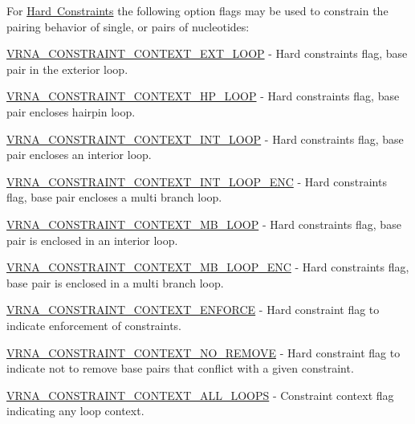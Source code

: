 For \mbox{\hyperlink{group__hard__constraints}{Hard Constraints}} the following option flags may be used to constrain the pairing behavior of single, or pairs of nucleotides\+:


\begin{DoxyItemize}
\item \mbox{\hyperlink{group__hard__constraints_ga9418eda62a5dec070896702c279d2548}{V\+R\+N\+A\+\_\+\+C\+O\+N\+S\+T\+R\+A\+I\+N\+T\+\_\+\+C\+O\+N\+T\+E\+X\+T\+\_\+\+E\+X\+T\+\_\+\+L\+O\+OP}} -\/ Hard constraints flag, base pair in the exterior loop.
\item \mbox{\hyperlink{group__hard__constraints_ga79203702b197b6b9d3b78eed40663eb1}{V\+R\+N\+A\+\_\+\+C\+O\+N\+S\+T\+R\+A\+I\+N\+T\+\_\+\+C\+O\+N\+T\+E\+X\+T\+\_\+\+H\+P\+\_\+\+L\+O\+OP}} -\/ Hard constraints flag, base pair encloses hairpin loop.
\item \mbox{\hyperlink{group__hard__constraints_ga21feeab3a9e5fa5a9e3d9ac0fcf5994f}{V\+R\+N\+A\+\_\+\+C\+O\+N\+S\+T\+R\+A\+I\+N\+T\+\_\+\+C\+O\+N\+T\+E\+X\+T\+\_\+\+I\+N\+T\+\_\+\+L\+O\+OP}} -\/ Hard constraints flag, base pair encloses an interior loop.
\item \mbox{\hyperlink{group__hard__constraints_ga0536288e04ff6332ecdc23ca4705402b}{V\+R\+N\+A\+\_\+\+C\+O\+N\+S\+T\+R\+A\+I\+N\+T\+\_\+\+C\+O\+N\+T\+E\+X\+T\+\_\+\+I\+N\+T\+\_\+\+L\+O\+O\+P\+\_\+\+E\+NC}} -\/ Hard constraints flag, base pair encloses a multi branch loop.
\item \mbox{\hyperlink{group__hard__constraints_ga456ecd2ff00056bb64da8dd4f61bbfc5}{V\+R\+N\+A\+\_\+\+C\+O\+N\+S\+T\+R\+A\+I\+N\+T\+\_\+\+C\+O\+N\+T\+E\+X\+T\+\_\+\+M\+B\+\_\+\+L\+O\+OP}} -\/ Hard constraints flag, base pair is enclosed in an interior loop.
\item \mbox{\hyperlink{group__hard__constraints_ga02a3d703ddbcfce393e4bbfcb9db7077}{V\+R\+N\+A\+\_\+\+C\+O\+N\+S\+T\+R\+A\+I\+N\+T\+\_\+\+C\+O\+N\+T\+E\+X\+T\+\_\+\+M\+B\+\_\+\+L\+O\+O\+P\+\_\+\+E\+NC}} -\/ Hard constraints flag, base pair is enclosed in a multi branch loop.
\item \mbox{\hyperlink{hard_8h_a1aa55f2c6347e670e003b1a765632dad}{V\+R\+N\+A\+\_\+\+C\+O\+N\+S\+T\+R\+A\+I\+N\+T\+\_\+\+C\+O\+N\+T\+E\+X\+T\+\_\+\+E\+N\+F\+O\+R\+CE}} -\/ Hard constraint flag to indicate enforcement of constraints.
\item \mbox{\hyperlink{hard_8h_a9fcac36535850ff612c7e6b1305304a1}{V\+R\+N\+A\+\_\+\+C\+O\+N\+S\+T\+R\+A\+I\+N\+T\+\_\+\+C\+O\+N\+T\+E\+X\+T\+\_\+\+N\+O\+\_\+\+R\+E\+M\+O\+VE}} -\/ Hard constraint flag to indicate not to remove base pairs that conflict with a given constraint.
\item \mbox{\hyperlink{group__hard__constraints_ga886d9127c49bb982a4b67cd7581e8a5a}{V\+R\+N\+A\+\_\+\+C\+O\+N\+S\+T\+R\+A\+I\+N\+T\+\_\+\+C\+O\+N\+T\+E\+X\+T\+\_\+\+A\+L\+L\+\_\+\+L\+O\+O\+PS}} -\/ Constraint context flag indicating any loop context.
\end{DoxyItemize}

